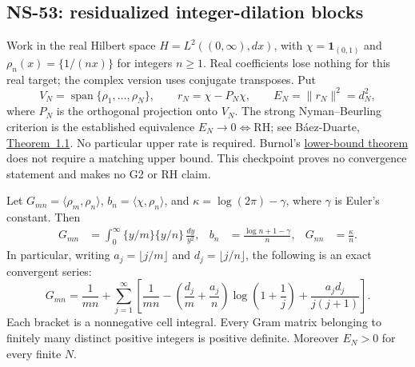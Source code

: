 \subsection{NS-53: residualized integer-dilation blocks}
\label{sec:ns53-nb-blocks}

Work in the real Hilbert space $H=L^2((0,\infty),dx)$, with
$\chi=\mathbf 1_{(0,1)}$ and $\rho_n(x)=\{1/(nx)\}$ for integers $n\geq1$.
Real coefficients lose nothing for this real target; the complex version
uses conjugate transposes. Put
\[
 V_N=\operatorname{span}\{\rho_1,\ldots,\rho_N\},\qquad
 r_N=\chi-P_N\chi,\qquad E_N=\|r_N\|^2=d_N^2,
\]
where $P_N$ is the orthogonal projection onto $V_N$.
The strong Nyman--Beurling criterion is the established equivalence
$E_N\to0\Longleftrightarrow\mathrm{RH}$; see B\'aez-Duarte,
\href{https://arxiv.org/abs/math/0202141}{Theorem~1.1}.
No particular upper rate is required. Burnol's
\href{https://doi.org/10.1006/aima.2001.2066}{lower-bound theorem}
does not require a matching upper bound. This checkpoint proves no
convergence statement and makes no G2 or RH claim.

\begin{proposition}
\label{prop:ns53-nb-entries}
Let $G_{mn}=\langle\rho_m,\rho_n\rangle$, $b_n=\langle\chi,\rho_n\rangle$,
and $\kappa=\log(2\pi)-\gamma$, where $\gamma$ is Euler's constant.
Then
\begin{align}
 G_{mn}&=\int_0^\infty\{y/m\}\{y/n\}\,\frac{dy}{y^2},
 & b_n&=\frac{\log n+1-\gamma}{n},
 &G_{nn}&=\frac{\kappa}{n}.\label{eq:ns53-nb-entries}
\end{align}
In particular, writing $a_j=\lfloor j/m\rfloor$ and
$d_j=\lfloor j/n\rfloor$, the following is an exact convergent series:
\begin{equation}
 G_{mn}=\frac1{mn}+\sum_{j=1}^{\infty}
 \left[\frac1{mn}-\left(\frac{d_j}{m}+\frac{a_j}{n}\right)
 \log\left(1+\frac1j\right)+\frac{a_jd_j}{j(j+1)}\right].
 \label{eq:ns53-nb-gram-series}
\end{equation}
Each bracket is a nonnegative cell integral. Every Gram matrix belonging
to finitely many distinct positive integers is positive definite.
Moreover $E_N>0$ for every finite $N$.
\end{proposition}

